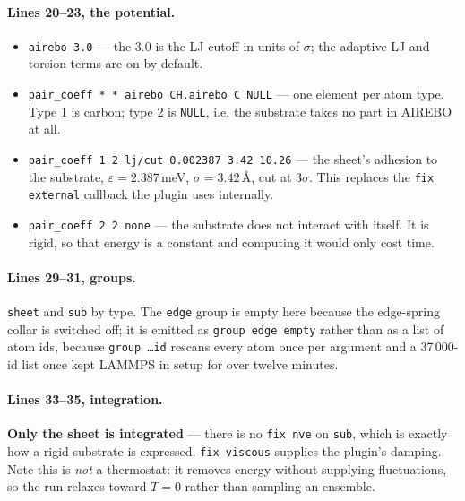 \documentclass[11pt,a4paper]{article}
\begin{document}
\paragraph{Lines 20--23, the potential.}
\begin{itemize}
\item \texttt{airebo 3.0} --- the 3.0 is the LJ cutoff in units of $\sigma$;
      the adaptive LJ and torsion terms are on by default.
\item \texttt{pair\_coeff * * airebo CH.airebo C NULL} --- one element per atom
      type. Type 1 is carbon; type 2 is \texttt{NULL}, i.e. the substrate takes
      no part in AIREBO at all.
\item \texttt{pair\_coeff 1 2 lj/cut 0.002387 3.42 10.26} --- the sheet's
      adhesion to the substrate, $\varepsilon = 2.387$\,meV, $\sigma = 3.42$\,\AA,
      cut at $3\sigma$. This replaces the \texttt{fix external} callback the
      plugin uses internally.
\item \texttt{pair\_coeff 2 2 none} --- the substrate does not interact with
      itself. It is rigid, so that energy is a constant and computing it would
      only cost time.
\end{itemize}

\paragraph{Lines 29--31, groups.} \texttt{sheet} and \texttt{sub} by type. The
\texttt{edge} group is empty here because the edge-spring collar is switched
off; it is emitted as \texttt{group edge empty} rather than as a list of atom
ids, because \texttt{group \dots id} rescans every atom once per argument and a
37\,000-id list once kept LAMMPS in setup for over twelve minutes.

\paragraph{Lines 33--35, integration.} \textbf{Only the sheet is integrated}
--- there is no \texttt{fix nve} on \texttt{sub}, which is exactly how a rigid
substrate is expressed. \texttt{fix viscous} supplies the plugin's damping.
Note this is \emph{not} a thermostat: it removes energy without supplying
fluctuations, so the run relaxes toward $T=0$ rather than sampling an ensemble.
\end{document}
